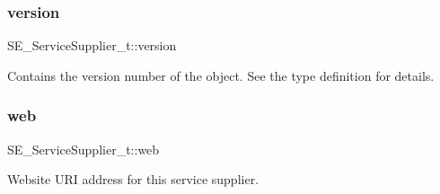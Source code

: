 \subsubsection{\texorpdfstring{version}{version}}
{\footnotesize\ttfamily S\+E\+\_\+\+Service\+Supplier\+\_\+t\+::version}

Contains the version number of the object. See the type definition for details. \mbox{\label{group__ServiceSupplier_gae334c85b63bc5c156ed70d2d7359b0f0}} 
\subsubsection{\texorpdfstring{web}{web}}
{\footnotesize\ttfamily S\+E\+\_\+\+Service\+Supplier\+\_\+t\+::web}

Website U\+RI address for this service supplier. 